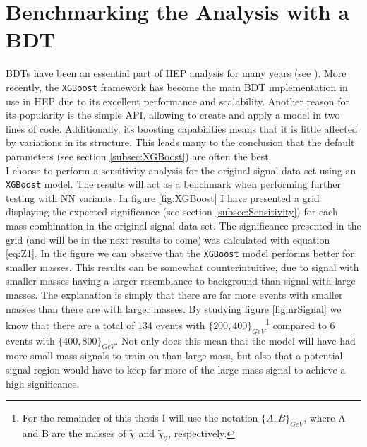 \section{Benchmarking the Analysis with a BDT}\label{sec:XGBoost}
\ac{BDT}s have been an essential part of \acf{HEP} analysis for many years (see 
\cite{ATLAS-CONF-2011-152,ATLAS-CONF-2017-064}). More recently, the \verb!XGBoost! 
framework has become the main \ac{BDT} implementation in use in \ac{HEP} due 
to its excellent performance and scalability. Another reason for its popularity is the simple \acf{API}, allowing 
to create and apply a model in two lines of code. Additionally, its boosting capabilities means 
that it is little affected by variations in its structure. This leads many to the conclusion that the default 
parameters (see section \ref{subsec:XGBoost}) are often the best. 
\\
I choose to perform a sensitivity analysis for the original signal data set using an \verb!XGBoost! model. The results
will act as a benchmark when performing further testing with \ac{NN} variants. In figure \ref{fig:XGBoost} 
I have presented a grid displaying the expected significance (see section \ref{subsec:Sensitivity}) for each 
mass combination in the original signal data set. The significance presented in the grid (and will be in the next results to come) 
was calculated with equation \ref{eq:Z1}. In the figure we can observe that the \verb!XGBoost! model performs
better for smaller masses. This results can be somewhat counterintuitive, due to signal with smaller masses 
having a larger resemblance to background than signal with large masses. The explanation is simply that there are
far more events with smaller masses than there are with larger masses. By studying figure \ref{fig:nrSignal} we know that 
there are a total of 134 events with $\{200,400\}_{GeV}$\footnote{For the remainder of this thesis I will use the notation $\{A,B\}_{GeV}$, 
where A and B are the masses of $\tilde{\chi}$ and $\tilde{\chi}_2$, respectively.} compared to 6 events 
with $\{400,800\}_{GeV}$. Not only does this mean that the model will have had more small mass signals to 
train on than large mass, but also that a potential signal region would have to keep far more of the large 
mass signal to achieve a high significance.\\
